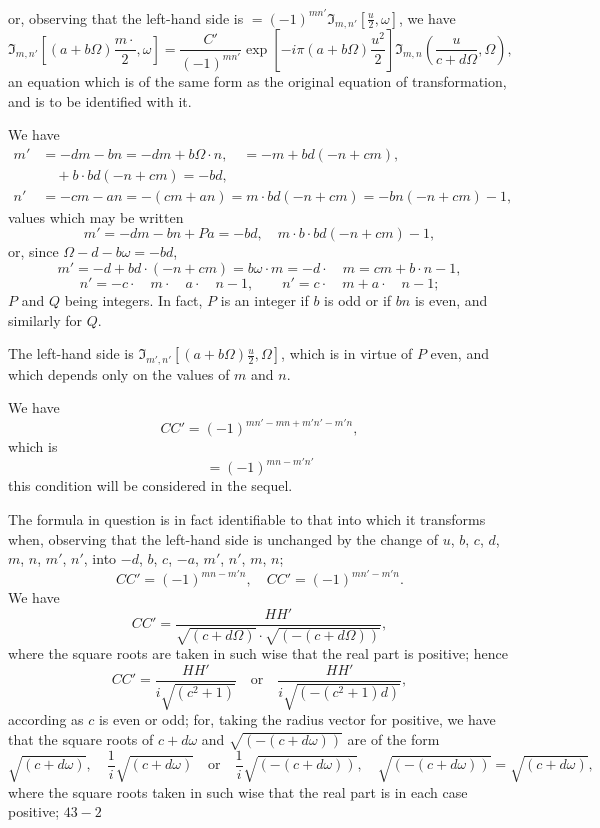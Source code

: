 \documentclass[12pt,a4paper]{article}
\theoremstyle{definition}
\begin{document}
\bigskip

\noindent or, observing that the left-hand side is $= (-1)^{mn'}\Im_{m,n'}\left[\frac{u}{2}, \omega\right]$, we have
\[
\Im_{m,n'}\left[(a + b\Omega)\frac{m\cdot}{2}, \omega\right] = \frac{C'}{(-1)^{mn'}} \exp\left[-i\pi(a + b\Omega)\frac{u^2}{2}\right] \Im_{m,n}\left(\frac{u}{c + d\Omega}, \Omega\right),
\]
an equation which is of the same form as the original equation of transformation, and is to be identified with it.

We have
\begin{align*}
m' &= -dm - bn = -dm + b\Omega \cdot n, \quad = -m + bd(-n + cm), \\
&\quad + b \cdot bd(-n + cm) = -bd, \\
n' &= -cm - an = -(cm + an) = m \cdot bd(-n + cm) = -bn(-n + cm) - 1,
\end{align*}
values which may be written
\[
m' = -dm - bn + Pa = -bd, \quad m \cdot b \cdot bd(-n + cm) - 1,
\]
or, since $\Omega - d - b\omega = -bd$,
\[
m' = -d + bd \cdot (-n + cm) = b\omega \cdot m = -d \cdot \quad m = cm + b \cdot n - 1,
\]
\[
n' = -c \cdot \quad m \cdot \quad a \cdot \quad n - 1, \quad \quad n' = c \cdot \quad m + a \cdot \quad n - 1;
\]
$P$ and $Q$ being integers. In fact, $P$ is an integer if $b$ is odd or if $bn$ is even, and similarly for $Q$.

The left-hand side is $\Im_{m',n'}\left[(a + b\Omega)\frac{u}{2}, \Omega\right]$, which is in virtue of $P$ even, and which depends only on the values of $m$ and $n$.

We have
\[
CC' = (-1)^{mn'-mn+m'n'-m'n},
\]
which is
\[
= (-1)^{mn-m'n'}
\]
this condition will be considered in the sequel.

The formula in question is in fact identifiable to that into which it transforms when, observing that the left-hand side is unchanged by the change of $u$, $b$, $c$, $d$, $m$, $n$, $m'$, $n'$, into $-d$, $b$, $c$, $-a$, $m'$, $n'$, $m$, $n$;
\[
CC' = (-1)^{mn-m'n}, \quad CC' = (-1)^{mn'-m'n}.
\]
We have
\[
CC' = \frac{HH'}{\sqrt{(c + d\Omega)} \cdot \sqrt{(-(c + d\Omega))}},
\]
where the square roots are taken in such wise that the real part is positive; hence
\[
CC' = \frac{HH'}{i\sqrt{(c^2 + 1)}} \quad \text{or} \quad \frac{HH'}{i\sqrt{(-(c^2 + 1)d)}},
\]
according as $c$ is even or odd; for, taking the radius vector for positive, we have that the square roots of $c + d\omega$ and $\sqrt{(-(c + d\omega))}$ are of the form
\[
\sqrt{(c + d\omega)}, \quad \frac{1}{i}\sqrt{(c + d\omega)} \quad \text{or} \quad \frac{1}{i}\sqrt{(-(c + d\omega))}, \quad \sqrt{(-(c + d\omega))} = \sqrt{(c + d\omega)},
\]
where the square roots taken in such wise that the real part is in each case positive;
\hfill $43-2$
\end{document}

